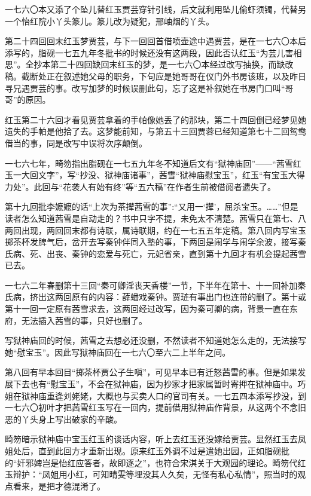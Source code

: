 \par 一七六〇本又添了个坠儿替红玉贾芸穿针引线，后文就利用坠儿偷虾须镯，代替另一个怡红院小丫头篆儿。篆儿改为疑犯，邢岫烟的丫头。
\par 第二十四回回末红玉梦贾芸，与下一回回首借喷壶途中遇贾芸，是在一七六〇本后添写的，脂砚一七五九年冬批书的时候还没有这两段，因此否认红玉“为芸儿害相思”。全抄本第二十四回缺回末红玉的梦，是一七六〇本经过改写抽换，而缺改稿。截断处正在叙述她父母的职务，下句应是她哥哥在仪门外书房该班，以及昨日寻兄遇贾芸的事。改写加梦的时候误删此句，忘了这是补叙她在书房门口叫“哥哥”的原因。
\par 红玉第二十六回才看见贾芸拿着的手帕像她丢了的那块，第二十四回倒已经梦见她遗失的手帕是他拾了去。这梦能前知，与第五十三回贾蓉已经知道第七十二回鸳鸯借当的事，同是改写中误将次序颠倒。
\par 一七六七年，畸笏指出脂砚在一七五九年冬不知道后文有“狱神庙回”——“茜雪红玉一大回文字”，写“抄没、狱神庙诸事”，茜雪“狱神庙慰宝玉”，红玉“有宝玉大得力处”。此回与“花袭人有始有终”等“五六稿”在作者生前被借阅者遗失了。
\par 第十九回批李嬷嬷的话“上次为茶撵茜雪的事”:“又用一‘撵’，屈杀宝玉。……”但是读者怎么知道茜雪是自动走的？书中只字不提，未免太不清楚。茜雪只在第七、八两回出现，两回回末都有诗联，属诗联期，约在一七五五年定稿。第八回内写宝玉掷茶杯发脾气后，岔开去写秦钟伴同入塾的事，下两回是闹学与闹学余波，接写秦氏病、死、出丧、秦钟的恋爱与死亡，元妃省亲，直到第十九回才有机会提起茜雪已去。
\par 一七六二年春删第十三回“秦可卿淫丧天香楼”一节，下半年在第十、十一回补加秦氏病，挤出这两回原有的内容：薛蟠戏秦钟。贾琏有事出门也连带的删了。第十或第十一回一定原有茜雪求去，这两回经过改写，因为秦可卿的病，背景一直在东府，无法插入茜雪的事，只好也删了。
\par 写狱神庙回的时候，茜雪之去想必还没删，不然读者不知道她怎么走的，无法接写她“慰宝玉”。因此写狱神庙回在一七六〇至六二上半年之间。
\par 第八回有早本回目“掷茶杯贾公子生嗔”，可见早本已有迁怒茜雪的事。但是如果发展下去也有“慰宝玉”，不会在狱神庙，因为抄家才把家属暂时寄押在狱神庙中。巧姐在狱神庙重逢刘姥姥，大概也与买卖人口的官司有关。一七五四本添写抄没，到一七六〇初叶才把茜雪红玉写在一回内，提前借用狱神庙作背景，从这两个不念旧恶的丫头身上写出破家的辛酸。
\par 畸笏暗示狱神庙中宝玉红玉的谈话内容，听上去红玉还没嫁给贾芸。显然红玉去凤姐处后，直到此回方才重新出现。原来红玉外调不过是遣她出园，正如脂砚批的“奸邪婢岂是怡红应答者，故即逐之”，也符合宋淇关于大观园的理论。畸笏代红玉辩护：“凤姐用小红，可知晴雯等埋没其人久矣，无怪有私心私情”，照当时的观点看来，是把才德混淆了。
